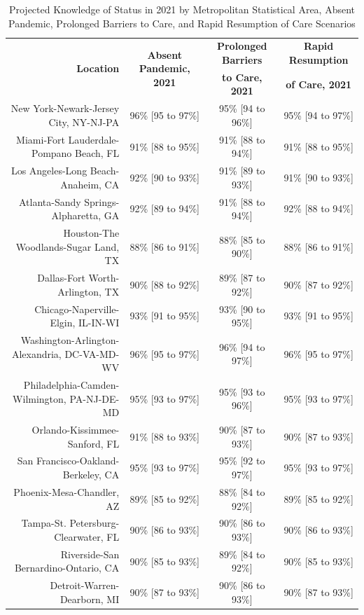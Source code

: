 \documentclass{article}
\begin{document}
\begin{table}[H]
	\caption{Projected Knowledge of Status in 2021 by Metropolitan Statistical Area, Absent Pandemic, Prolonged Barriers to Care, and Rapid Resumption of Care Scenarios}
	\footnotesize
	\begin{tabular}{|r|c|c|c|}
		\hline
		\multirow{2}{*}{\textbf{Location}} & \multirow{2}{*}{\textbf{Absent Pandemic, 2021}} & \textbf{Prolonged Barriers} & \textbf{Rapid Resumption}\\
		&  & \textbf{to Care, 2021} & \textbf{of Care, 2021}\\
		\hline\hline
		New York-Newark-Jersey City, NY-NJ-PA & 96\% [95 to 97\%] & 95\% [94 to 96\%] & 95\% [94 to 97\%]\\
		Miami-Fort Lauderdale-Pompano Beach, FL & 91\% [88 to 95\%] & 91\% [88 to 94\%] & 91\% [88 to 95\%]\\
		Los Angeles-Long Beach-Anaheim, CA & 92\% [90 to 93\%] & 91\% [89 to 93\%] & 91\% [90 to 93\%]\\
		Atlanta-Sandy Springs-Alpharetta, GA & 92\% [89 to 94\%] & 91\% [88 to 94\%] & 92\% [88 to 94\%]\\
		Houston-The Woodlands-Sugar Land, TX & 88\% [86 to 91\%] & 88\% [85 to 90\%] & 88\% [86 to 91\%]\\
		Dallas-Fort Worth-Arlington, TX & 90\% [88 to 92\%] & 89\% [87 to 92\%] & 90\% [87 to 92\%]\\
		Chicago-Naperville-Elgin, IL-IN-WI & 93\% [91 to 95\%] & 93\% [90 to 95\%] & 93\% [91 to 95\%]\\
		Washington-Arlington-Alexandria, DC-VA-MD-WV & 96\% [95 to 97\%] & 96\% [94 to 97\%] & 96\% [95 to 97\%]\\
		Philadelphia-Camden-Wilmington, PA-NJ-DE-MD & 95\% [93 to 97\%] & 95\% [93 to 96\%] & 95\% [93 to 97\%]\\
		Orlando-Kissimmee-Sanford, FL & 91\% [88 to 93\%] & 90\% [87 to 93\%] & 90\% [87 to 93\%]\\
		San Francisco-Oakland-Berkeley, CA & 95\% [93 to 97\%] & 95\% [92 to 97\%] & 95\% [93 to 97\%]\\
		Phoenix-Mesa-Chandler, AZ & 89\% [85 to 92\%] & 88\% [84 to 92\%] & 89\% [85 to 92\%]\\
		Tampa-St. Petersburg-Clearwater, FL & 90\% [86 to 93\%] & 90\% [86 to 93\%] & 90\% [86 to 93\%]\\
		Riverside-San Bernardino-Ontario, CA & 90\% [85 to 93\%] & 89\% [84 to 92\%] & 90\% [85 to 93\%]\\
		Detroit-Warren-Dearborn, MI & 90\% [87 to 93\%] & 90\% [86 to 93\%] & 90\% [87 to 93\%]\\

\end{tabular}
\end{table}
\end{document}
